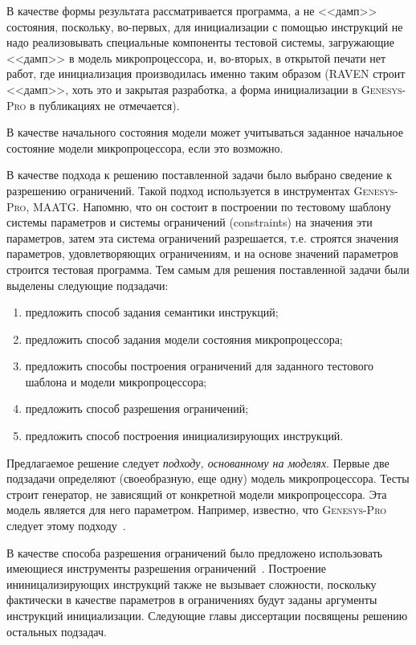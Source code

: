 В качестве формы результата рассматривается программа, а не <<дамп>> состояния, поскольку, во-первых, для инициализации с помощью инструкций не надо реализовывать специальные компоненты тестовой системы, загружающие <<дамп>> в модель микропроцессора, и, во-вторых, в открытой печати нет работ, где инициализация производилась именно таким образом (\textsc{RAVEN} строит <<дамп>>, хоть это и закрытая разработка, а форма инициализации в \textsc{Genesys-Pro} в публикациях не отмечается).

В качестве начального состояния модели может учитываться заданное начальное состояние модели микропроцессора, если это возможно.

В качестве подхода к решению поставленной задачи было выбрано сведение к разрешению ограничений. Такой подход используется в инструментах \textsc{Genesys-Pro}, \textsc{MAATG}. Напомню, что он состоит в построении по тестовому шаблону системы параметров и системы ограничений (constraints) на значения эти параметров, затем эта система ограничений разрешается, т.е. строятся значения параметров, удовлетворяющих ограничениям, и на основе значений параметров строится тестовая программа. Тем самым для решения поставленной задачи были выделены следующие подзадачи:
\begin{enumerate}
  \item предложить способ задания семантики инструкций;
  \item предложить способ задания модели состояния микропроцессора;
  \item предложить способы построения ограничений для заданного тестового шаблона и модели микропроцессора;
  \item предложить способ разрешения ограничений;
  \item предложить способ построения инициализирующих инструкций.
\end{enumerate}

Предлагаемое решение следует \emph{подходу, основанному на моделях}. Первые две подзадачи определяют (своеобразную, еще одну) модель микропроцессора. Тесты строит генератор, не зависящий от конкретной модели микропроцессора. Эта модель является для него параметром. Например, известно, что \textsc{Genesys-Pro} следует этому подходу~\cite{GenesysSolver}.

В качестве способа разрешения ограничений было предложено использовать имеющиеся инструменты разрешения ограничений~\cite{Z3}. Построение ининицализирующих инструкций также не вызывает сложности, поскольку фактически в качестве параметров в ограничениях будут заданы аргументы инструкций инициализации. Следующие главы диссертации посвящены решению остальных подзадач.

